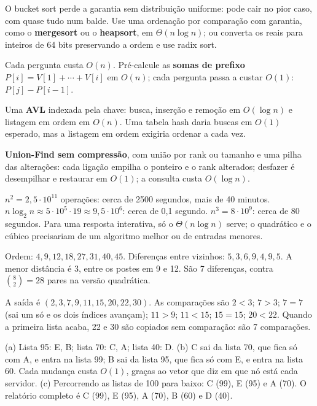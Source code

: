 O bucket sort perde a garantia sem distribuição uniforme: pode cair no pior caso, com quase tudo num balde. Use uma ordenação por comparação com garantia, como o \textbf{mergesort} ou o \textbf{heapsort}, em $\Theta(n\log n)$; ou converta os reais para inteiros de 64 bits preservando a ordem e use radix sort.

 Cada pergunta custa $O(n)$. Pré-calcule as \textbf{somas de prefixo} $P[i]=V[1]+\cdots+V[i]$ em $O(n)$; cada pergunta passa a custar $O(1)$: $P[j]-P[i-1]$.

 Uma \textbf{AVL} indexada pela chave: busca, inserção e remoção em $O(\log n)$ e listagem em ordem em $O(n)$. Uma tabela hash daria buscas em $O(1)$ esperado, mas a listagem em ordem exigiria ordenar a cada vez.

 \textbf{Union-Find sem compressão}, com união por rank ou tamanho e uma pilha das alterações: cada ligação empilha o ponteiro e o rank alterados; desfazer é desempilhar e restaurar em $O(1)$; a consulta custa $O(\log n)$.

 $n^2=2{,}5\cdot10^{11}$ operações: cerca de 2500 segundos, mais de 40 minutos. $n\log_2n\approx5\cdot10^5\cdot19\approx9{,}5\cdot10^6$: cerca de 0,1 segundo. $n^3=8\cdot10^9$: cerca de 80 segundos. Para uma resposta interativa, só o $\Theta(n\log n)$ serve; o quadrático e o cúbico precisariam de um algoritmo melhor ou de entradas menores.

 Ordem: $4,9,12,18,27,31,40,45$. Diferenças entre vizinhos: $5,3,6,9,4,9,5$. A menor distância é 3, entre os postes em 9 e 12. São 7 diferenças, contra $\binom82=28$ pares na versão quadrática.

 A saída é $(2,3,7,9,11,15,20,22,30)$. As comparações são $2<3$; $7>3$; $7=7$ (sai um só e os dois índices avançam); $11>9$; $11<15$; $15=15$; $20<22$. Quando a primeira lista acaba, 22 e 30 são copiados sem comparação: são 7 comparações.

 (a) Lista 95: E, B; lista 70: C, A; lista 40: D. (b) C sai da lista 70, que fica só com A, e entra na lista 99; B sai da lista 95, que fica só com E, e entra na lista 60. Cada mudança custa $O(1)$, graças ao vetor que diz em que nó está cada servidor. (c) Percorrendo as listas de 100 para baixo: C (99), E (95) e A (70). O relatório completo é C (99), E (95), A (70), B (60) e D (40).
